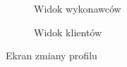\begin{figure}[ht]
\begin{subfigure}[t]{0.33\textwidth}
    \caption{Widok wykonawców}
  \end{subfigure}
  \begin{subfigure}[t]{0.33\textwidth}
    \centering
    \caption{Widok klientów}
  \end{subfigure}
  \caption{Ekran zmiany profilu}
  \label{fig:info-expert}
\end{figure}

